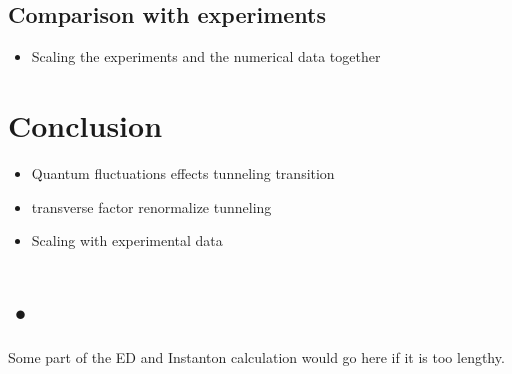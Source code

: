 \documentclass[prb,twocolumn,showpacs,preprintnumbers,amsmath,amssymb, superscriptaddress]{revtex4-2}
\newcommand{\1}{{1\hspace*{-0.5ex} \textrm{l} \hspace*{0.5ex}}}
\begin{document}
\subsection{Comparison with experiments}
\begin{itemize}
\item Scaling the experiments and the numerical data together
\end{itemize}

	
\section{Conclusion}
\begin{itemize}
\item Quantum fluctuations effects tunneling transition
\item transverse factor renormalize tunneling
\item Scaling with experimental data
\end{itemize}

  

     
 
\appendix
\section{•}
Some part of the ED and Instanton calculation would go here if it is too lengthy.

	
	
	



\end{document}
